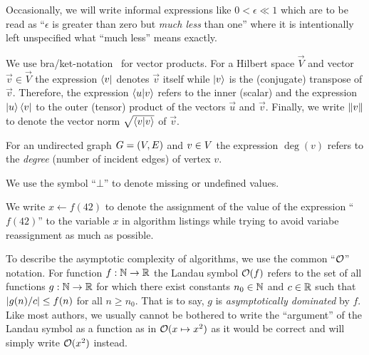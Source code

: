Occasionally, we will write informal expressions like \(0<\epsilon\ll1\) which are to be read as \enquote{\(\epsilon\)
  is greater than zero but \emph{much less} than one} where it is intentionally left unspecified what \enquote{much
  less} means exactly.

We use bra/ket-notation~\cite{Dirac1939} for vector products.  For a Hilbert space \(\Vec{V}\) and vector
\(\vec{v}\in\Vec{V}\) the expression \(\bra{\vec{v}}\) denotes \(\vec{v}\) itself while \(\ket{\vec{v}}\) is the
(conjugate) transpose of \(\vec{v}\).  Therefore, the expression \(\braket{\vec{u}}{\vec{v}}\) refers to the inner
(scalar) and the expression \(\ket{\vec{u}}\bra{\vec{v}}\) to the outer (tensor) product of the vectors \(\vec{u}\) and
\(\vec{v}\).  Finally, we write \(\left\lVert\relax{v}\right\rVert\) to denote the vector norm \(\sqrt{\braket{\vec{v}}{\vec{v}}}\) of
\(\vec{v}\).

For an undirected graph \(G=(V,E)\) and \(v\in V\) the expression \(\deg(v)\) refers to the \emph{degree}
(number of incident edges) of vertex \(v\).

We use the symbol \enquote{\(\bot\)} to denote missing or undefined values.

We write \(x\gets{}f(42)\) to denote the assignment of the value of the expression \enquote{\(f(42)\)} to the variable
\(x\) in algorithm listings while trying to avoid variabe reassignment as much as possible.

To describe the asymptotic complexity of algorithms, we use the common \enquote{\(\operatorname{\mathcal{O}}\)} notation.  For function
\(f:\IntsN\to\Reals\) the Landau symbol \(\operatorname{\mathcal{O}}(f)\) refers to the set of all functions \(g:\IntsN\to\Reals\) for which
there exist constants \(n_0\in\mathbb{N}\) and \(c\in\Reals\) such that \(\left\lvert g(n)/c\right\rvert\leq{}f(n)\) for all \(n\geq{}n_0\).
That is to say, \(g\) is \emph{asymptotically dominated} by \(f\).  Like most authors, we usually cannot be bothered to
write the \enquote{argument} of the Landau symbol as a function as in \(\operatorname{\mathcal{O}}(x\mapsto{}x^2)\) as it would be correct
and will simply write \(\operatorname{\mathcal{O}}(x^2)\) instead.
